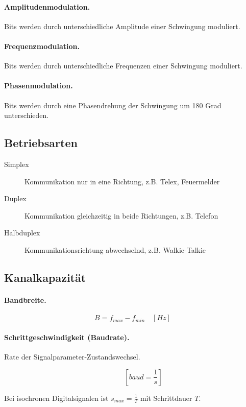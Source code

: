 \documentclass[]{scrartcl}
\begin{document}
\paragraph{Amplitudenmodulation.} Bits werden durch unterschiedliche Amplitude einer Schwingung moduliert.

\paragraph{Frequenzmodulation.} Bits werden durch unterschiedliche Frequenzen einer Schwingung moduliert.

\paragraph{Phasenmodulation. } Bits werden durch eine Phasendrehung der Schwingung um 180 Grad unterschieden.


\subsection{Betriebsarten}

\begin{description}
\item[Simplex] Kommunikation nur in eine Richtung, z.B. Telex, Feuermelder
\item[Duplex] Kommunikation gleichzeitig in beide Richtungen, z.B. Telefon
\item[Halbduplex] Kommunikationsrichtung abwechselnd, z.B. Walkie-Talkie
\end{description}


\subsection{Kanalkapazit\"at}


\paragraph{Bandbreite. }

$$B = f_{max} - f_{min} \quad [Hz]$$


\paragraph{Schrittgeschwindigkeit (Baudrate). } Rate der Signalparameter-Zustandswechsel. 

$$\quad  \qquad [baud = \frac{1}{s}]$$

Bei isochronen Digitalsignalen ist $s_{max}  = \frac{1}{T}$ mit Schrittdauer $T$.
\end{document}
